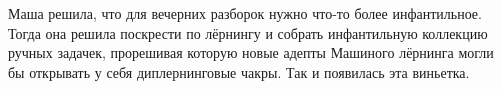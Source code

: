 \documentclass[12pt, a4paper, oneside]{article}
\begin{document}
    Маша решила, что для вечерних разборок нужно что-то более инфантильное. Тогда она решила поскрести по лёрнингу и собрать инфантильную коллекцию ручных задачек, прорешивая которую новые адепты Машиного лёрнинга могли бы открывать у себя диплернинговые чакры. Так и появилась эта виньетка.  
	

\newpage 

% 


% 


%  


% 

\newpage 



\newpage 

% 

\newpage 

% 







\end{document}
